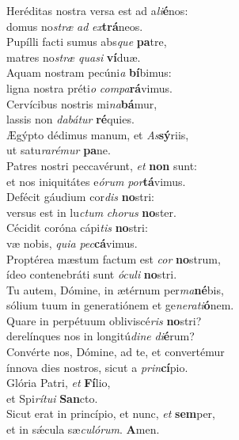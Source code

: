 \evenverse Heréditas nostra versa est ad a\textit{li}\textbf{é}nos:~\*\\
\evenverse domus no\textit{stræ} \textit{ad} \textit{ex}\textbf{trá}neos.\\
\oddverse Pupílli facti sumus abs\textit{que} \textbf{pa}tre,~\*\\
\oddverse matres no\textit{stræ} \textit{qua}\textit{si} \textbf{ví}duæ.\\
\evenverse Aquam nostram pecúni\textit{a} \textbf{bí}bimus:~\*\\
\evenverse ligna nostra préti\textit{o} \textit{com}\textit{pa}\textbf{rá}vimus.\\
\oddverse Cervícibus nostris mi\textit{na}\textbf{bá}mur,~\*\\
\oddverse lassis non \textit{da}\textit{bá}\textit{tur} \textbf{ré}quies.\\
\evenverse Ægýpto dédimus manum, et \textit{As}\textbf{sý}riis,~\*\\
\evenverse ut satu\textit{ra}\textit{ré}\textit{mur} \textbf{pa}ne.\\
\oddverse Patres nostri peccavérunt, \textit{et} \textbf{non} sunt:~\*\\
\oddverse et nos iniquitátes e\textit{ó}\textit{rum} \textit{por}\textbf{tá}vimus.\\
\evenverse Defécit gáudium cor\textit{dis} \textbf{no}stri:~\*\\
\evenverse versus est in lu\textit{ctum} \textit{cho}\textit{rus} \textbf{no}ster.\\
\oddverse Cécidit coróna cápi\textit{tis} \textbf{no}stri:~\*\\
\oddverse væ nobis, \textit{qui}\textit{a} \textit{pec}\textbf{cá}vimus.\\
\evenverse Proptérea mæstum factum est \textit{cor} \textbf{no}strum,~\*\\
\evenverse ídeo contenebráti sunt \textit{ó}\textit{cu}\textit{li} \textbf{no}stri.\\
\oddverse Tu autem, Dómine, in ætérnum per\textit{ma}\textbf{né}bis,~\*\\
\oddverse sólium tuum in generatiónem et ge\textit{ne}\textit{ra}\textit{ti}\textbf{ó}nem.\\
\evenverse Quare in perpétuum obliviscé\textit{ris} \textbf{no}stri?~\*\\
\evenverse derelínques nos in longitú\textit{di}\textit{ne} \textit{di}\textbf{é}rum?\\
\oddverse Convérte nos, Dómine, ad te, et convertémur~\*\\
\oddverse ínnova dies nostros, sicut a \textit{prin}\textbf{cí}pio.\\
\evenverse Glória Patri, \textit{et} \textbf{Fí}lio,~\*\\
\evenverse et Spi\textit{rí}\textit{tu}\textit{i} \textbf{San}cto.\\
\oddverse Sicut erat in princípio, et nunc, \textit{et} \textbf{sem}per,~\*\\
\oddverse et in sǽcula sæ\textit{cu}\textit{ló}\textit{rum}. \textbf{A}men.\\
